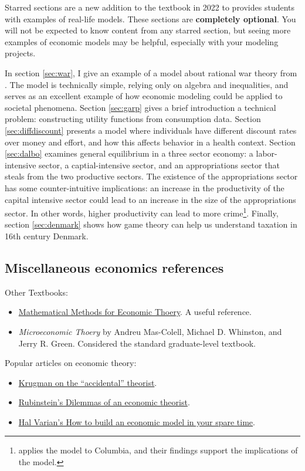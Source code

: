 Starred sections are a new addition to the textbook in 2022 to provides students with examples of real-life models. These sections are \textbf{completely optional}. You will not be expected to know content from any starred section, but seeing more examples of economic models may be helpful, especially with your modeling projects. 

In section \ref{sec:war}, I give an example of a model about rational war theory from \citet{war}. The model is technically simple, relying only on algebra and inequalities, and serves as an excellent example of how economic modeling could be applied to societal phenomena. Section \ref{sec:garp} gives a brief introduction a technical problem: constructing utility functions from consumption data. Section \ref{sec:diffdiscount} presents a model where individuals have different discount rates over money and effort, and how this affects behavior in a health context. Section \ref{sec:dalbo} examines general equilibrium in a three sector economy: a labor-intensive sector, a captial-intensive sector, and an appropriations sector that steals from the two productive sectors. The existence of the appropriations sector has some counter-intuitive implications: an increase in the productivity of the capital intensive sector could lead to an increase in the size of the appropriations sector. In other words, higher productivity can lead to more crime\footnote{\citet{dube2013commodity} applies the model to Columbia, and their findings support the implications of the model.}. Finally, section \ref{sec:denmark} shows how game theory can help us understand taxation in 16th century Denmark. 


\subsection*{Miscellaneous economics references}

Other Textbooks:
\begin{itemize}
    \item \href{https://mjo.osborne.economics.utoronto.ca/index.php/tutorial/index/1/int/i}{Mathematical Methods for Economic Thoery}. A useful reference.
    \item \textit{Microeconomic Thoery} by Andreu Mas-Colell, Michael D. Whinston, and Jerry R. Green. Considered the standard graduate-level textbook. 
\end{itemize}


Popular articles on economic theory:
\begin{itemize}
    \item \href{https://slate.com/business/1997/01/the-accidental-theorist.html}{Krugman on the ``accidental'' theorist}. 
    \item \href{https://www.jstor.org/stable/3805911}{Rubinstein's Dilemmas of an economic theorist}.
    \item \href{https://www.jstor.org/stable/25604102}{Hal Varian's How to build an economic model in your spare time}. 
\end{itemize}

